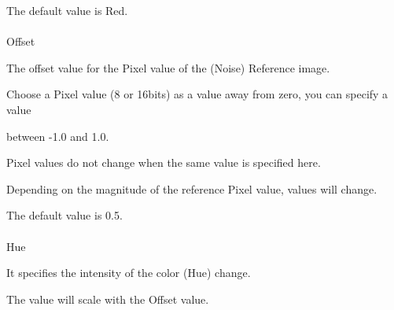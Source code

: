 \documentclass[a4paper,12pt]{article}
\begin{document}
The default value is \textquotedbl Red\textquotedbl .\\
\\
Offset\par
The offset value for the Pixel value of the (Noise) Reference image.\par
Choose a Pixel value (8 or 16bits) as a value away from zero, you can specify a value\par
between -1.0 and 1.0.\par
Pixel values do not change when the same value is specified here.\par
Depending on the magnitude of the reference Pixel value, values will change.\par
The default value is 0.5.\\
\\
Hue\par
It specifies the intensity of the color (Hue) change.\par
The value will scale with the Offset value.

\newpage

\thispagestyle{empty}
\end{document}
